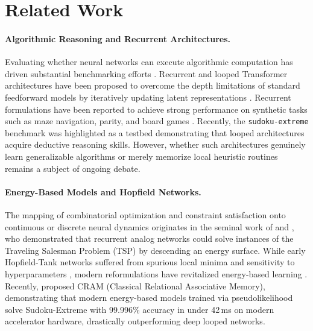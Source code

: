 \documentclass{article} %
\begin{document}
\section{Related Work}
\label{sec:related_work}

\paragraph{Algorithmic Reasoning and Recurrent Architectures.}
Evaluating whether neural networks can execute algorithmic computation has driven substantial benchmarking efforts \citep{graves2014neural,velickovic2022clrs}. Recurrent and looped Transformer architectures have been proposed to overcome the depth limitations of standard feedforward models by iteratively updating latent representations \citep{dehghani2018universal,bansal2022end,giannou2023looped}. Recurrent formulations have been reported to achieve strong performance on synthetic tasks such as maze navigation, parity, and board games \citep{schwarzschild2021can,banino2021pico}. Recently, the \texttt{sudoku-extreme} benchmark \citep{sapientinc_sudoku_extreme} was highlighted as a testbed demonstrating that looped architectures acquire deductive reasoning skills. However, whether such architectures genuinely learn generalizable algorithms or merely memorize local heuristic routines remains a subject of ongoing debate.

\paragraph{Energy-Based Models and Hopfield Networks.}
The mapping of combinatorial optimization and constraint satisfaction onto continuous or discrete neural dynamics originates in the seminal work of \citet{hopfield1982neural} and \citet{hopfield1985neural}, who demonstrated that recurrent analog networks could solve instances of the Traveling Salesman Problem (TSP) by descending an energy surface. While early Hopfield-Tank networks suffered from spurious local minima and sensitivity to hyperparameters \citep{wilson1988stability}, modern reformulations have revitalized energy-based learning \citep{krotov2016dense,demircigil2017model,ramsauer2020hopfield,lecun2006tutorial}. Recently, \citet{hoover2026classical} proposed CRAM (Classical Relational Associative Memory), demonstrating that modern energy-based models trained via pseudolikelihood \citep{besag1974spatial} solve Sudoku-Extreme with 99.996\% accuracy in under 42\,ms on modern accelerator hardware, drastically outperforming deep looped networks.
\end{document}
